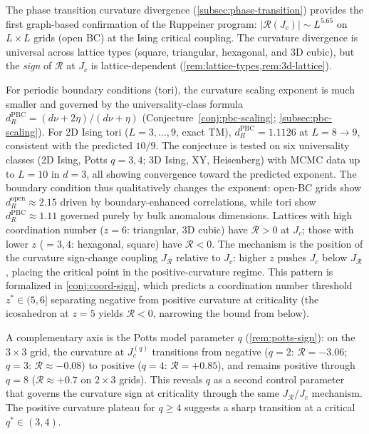 \documentclass[11pt]{article}
\theoremstyle{definition}
\theoremstyle{remark}
\newcommand{\Scal}{\mathcal{R}}
\begin{document}
The phase transition curvature divergence (\cref{subsec:phase-transition})
provides the first graph-based confirmation of the Ruppeiner program:
$|\Scal(J_c)| \sim L^{5.65}$ on $L \times L$ grids (open BC) at the Ising
critical coupling. The curvature divergence is universal across lattice types
(square, triangular, hexagonal, and 3D cubic), but the \emph{sign} of
$\Scal$ at $J_c$ is lattice-dependent (\cref{rem:lattice-types,rem:3d-lattice}).

For periodic boundary conditions (tori), the curvature scaling exponent is
much smaller and governed by the universality-class formula
$d_R^{\mathrm{PBC}} = (d\nu + 2\eta)/(d\nu + \eta)$ (Conjecture~\ref{conj:pbc-scaling};
\cref{subsec:pbc-scaling}). For 2D Ising tori ($L = 3, \ldots, 9$, exact TM),
$d_R^{\mathrm{PBC}} = 1.1126$ at $L = 8{\to}9$, consistent with the predicted $10/9$.
The conjecture is tested on six universality classes
(2D Ising, Potts $q=3,4$; 3D Ising, XY, Heisenberg) with MCMC data
up to $L = 10$ in $d = 3$, all showing convergence toward the predicted exponent.
The boundary condition thus
qualitatively changes the exponent: open-BC grids show $d_R^{\mathrm{open}} \approx 2.15$
driven by boundary-enhanced correlations, while tori show $d_R^{\mathrm{PBC}} \approx 1.11$
governed purely by bulk anomalous dimensions.
Lattices with high coordination number ($z = 6$: triangular, 3D cubic)
have $\Scal > 0$ at $J_c$; those with lower $z$ ($= 3, 4$: hexagonal,
square) have $\Scal < 0$. The mechanism is the position of the curvature
sign-change coupling $J_{\Scal}$ relative to $J_c$: higher $z$ pushes
$J_c$ below $J_{\Scal}$, placing the critical point in the
positive-curvature regime. This pattern is formalized in
\cref{conj:coord-sign}, which predicts a coordination number
threshold $z^* \in (5, 6]$ separating negative from positive
curvature at criticality (the icosahedron at $z = 5$ yields
$\Scal < 0$, narrowing the bound from below).

A complementary axis is the Potts model parameter $q$
(\cref{rem:potts-sign}): on the $3 \times 3$ grid,
the curvature at $J_c^{(q)}$ transitions from negative ($q = 2$:
$\Scal = -3.06$; $q = 3$: $\Scal \approx -0.08$) to positive
($q = 4$: $\Scal = +0.85$), and remains positive through $q = 8$
($\Scal \approx +0.7$ on $2 \times 3$ grids). This reveals $q$
as a second control parameter that governs the curvature sign at
criticality through the same $J_{\Scal}/J_c$ mechanism. The
positive curvature plateau for $q \geq 4$ suggests a sharp
transition at a critical $q^* \in (3, 4)$.
\end{document}
